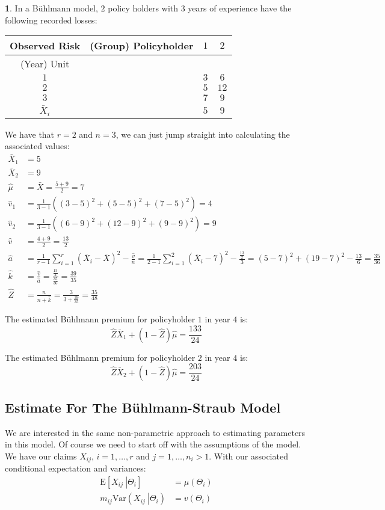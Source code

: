 \documentclass[english,12pt]{article}
\theoremstyle{plain}
\theoremstyle{definition}
\newtheorem*{example}{\protect\examplename}
\theoremstyle{definition} %
\providecommand{\examplename}{Example}
\newcommand{\brac}[1]{\left(#1\right)} %
\newcommand{\condex}[2]{\mbox{E} \left[ \left. #1 \ \right\vert \left. #2 \right. \right]}
\newcommand{\condvar}[2]{\mbox{Var} \left( \left. #1 \ \right\lvert \left. #2 \right. \right)}
\begin{document}
\begin{example}
In a B\"{u}hlmann model, $2$ policy holders with $3$ years of experience have the following recorded losses:

\begin{center}
\begin{tabular}{c|c|cc}
Observed Risk & (Group) Policyholder & $1$ & $2$\\
\hline
(Year) Unit &  & &\\
$1$ && $3$ & $6$\\
$2$ && $5$ & $12$\\
$3$ && $7$ & $9$\\ 
$\bar{X}_i$ && $5$ & $9$
\end{tabular}
\end{center}

We have that $r=2$ and $n=3$, we can just jump straight into calculating the associated values:
\begin{align*}
\bar{X}_1&=5\\
\bar{X}_2&=9\\
\hat{\mu}&=\bar{X}
=\frac{5+9}{2}
=7\\
\hat{v}_1&=\frac{1}{3-1}\brac{(3-5)^2+(5-5)^2+(7-5)^2}
=4\\
\hat{v}_2&=\frac{1}{3-1}\brac{(6-9)^2+(12-9)^2+(9-9)^2}
=9\\
\hat{v}&=\frac{4+9}{2}
=\frac{13}{2}\\
\hat{a}&=\frac{1}{r-1}\sum_{i=1}^r(\bar{X}_i-\bar{X})^2-\frac{\hat{v}}{n}
=\frac{1}{2-1}\sum_{i=1}^2(\bar{X}_i-7)^2-\frac{\frac{13}{2}}{3}
=(5-7)^2+(19-7)^2-\frac{13}{6}
=\frac{35}{36}\\
\hat{k}&=\frac{\hat{v}}{\hat{a}}
=\frac{\frac{13}{2}}{\frac{35}{36}}
=\frac{39}{35}\\
\hat{Z}&=\frac{n}{n+\hat{k}}
=\frac{3}{3+\frac{39}{35}}
=\frac{35}{48}
\end{align*}

The estimated B\"{u}hlmann premium for policyholder $1$ in year $4$ is:
\[\hat{Z}\bar{X}_1+(1-\hat{Z})\hat{\mu}=\frac{133}{24}\]

The estimated B\"{u}hlmann premium for policyholder $2$ in year $4$ is:
\[\hat{Z}\bar{X}_2+(1-\hat{Z})\hat{\mu}=\frac{203}{24}\]
\end{example}

\subsection{Estimate For The B\"{u}hlmann-Straub Model}
We are interested in the same non-parametric approach to estimating parameters in this model.  Of course we need to start off with the assumptions of the model.  We have our claims $X_{ij}$, $i=1,\ldots,r$ and $j=1,\ldots,n_i>1$.  With our associated conditional expectation and variances:
\begin{align*}
\condex{X_{ij}}{\Theta_i}&=\mu(\Theta_i)\\
m_{ij}\condvar{X_{ij}}{\Theta_i}&=v(\Theta_i)
\end{align*}
\end{document}
